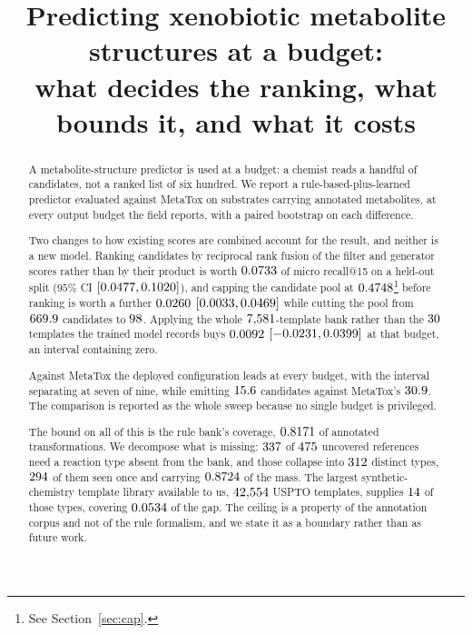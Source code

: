 \documentclass[11pt]{article}
\title{Predicting xenobiotic metabolite structures at a budget:\\
what decides the ranking, what bounds it, and what it costs}
\date{}
\begin{document}
\maketitle

\begin{abstract}
A metabolite-structure predictor is used at a budget: a chemist reads a handful of candidates, not
a ranked list of six hundred. We report a rule-based-plus-learned predictor evaluated against
MetaTox on \numPopulationN{} substrates carrying \numPopulationReferences{} annotated metabolites,
at every output budget the field reports, with a paired bootstrap on each difference.

Two changes to how existing scores are combined account for the result, and neither is a new model.
Ranking candidates by reciprocal rank fusion of the filter and generator scores rather than by
their product is worth $0.0733$ of micro recall@15 on a held-out split
($95\%$ CI $[0.0477, 0.1020]$), and capping the candidate pool at
$0.4748$\footnote{See Section~\ref{sec:cap}.} before ranking is worth a further
$0.0260$ $[0.0033, 0.0469]$ while cutting the pool from
$669.9$ candidates to $98$. Applying the whole
$7{,}581$-template bank rather than the $30$ templates the trained model records
buys $0.0092$ $[-0.0231, 0.0399]$ at that budget, an interval containing zero.

Against MetaTox the deployed configuration leads at every budget, with the interval separating at
seven of nine, while emitting $15.6$ candidates against MetaTox's
$30.9$. The comparison is reported as the whole sweep because no single budget is
privileged.

The bound on all of this is the rule bank's coverage, $0.8171$ of annotated
transformations. We decompose what is missing: $337$ of $475$
uncovered references need a reaction type absent from the bank, and those collapse into
$312$ distinct types, $294$ of them seen once and carrying
$0.8724$ of the mass. The largest synthetic-chemistry template library available to
us, $42{,}554$ USPTO templates, supplies $14$ of those types, covering
$0.0534$ of the gap. The ceiling is a property of the annotation corpus and not of the
rule formalism, and we state it as a boundary rather than as future work.
\end{abstract}
\end{document}
